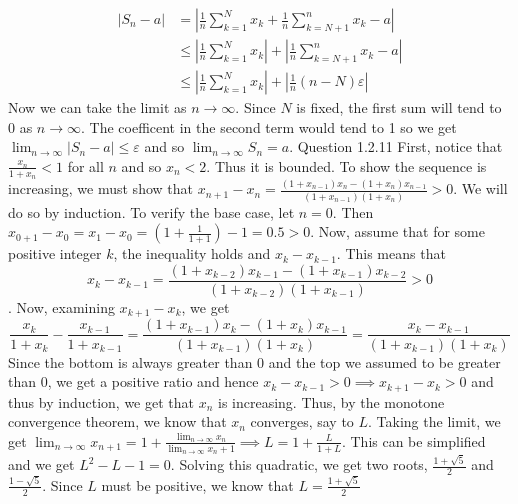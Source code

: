 \documentclass[12pt]{exam}
\begin{document}
\begin{questions}
\begin{align*}
    |S_n - a| &= \left| \frac{1}{n} \sum_{k=1}^{N} x_k + \frac{1}{n} \sum_{k=N+1}^{n} x_k - a \right| \\
              &\leq \left| \frac{1}{n} \sum_{k=1}^{N} x_k \right| + \left| \frac{1}{n} \sum_{k=N+1}^{n} x_k - a \right| \\
              &\leq \left| \frac{1}{n} \sum_{k=1}^{N} x_k \right| + \left| \frac{1}{n} (n - N) \varepsilon \right|
\end{align*}
Now we can take the limit as $n\rightarrow \infty$. Since $N$ is fixed, the first sum will tend to $0$ as $n\rightarrow\infty$. The coefficent in the second term would tend to 1 so we get $\lim_{n\rightarrow \infty} |S_n-a| \leq \varepsilon$ and so $\lim_{n\rightarrow \infty} S_n = a$.
\question Question 1.2.11 \newline
First, notice that $\frac{x_n}{1+x_n} < 1$ for all $n$ and so $x_n < 2$. Thus it is bounded. To show the sequence is increasing, we must show that $x_{n+1} - x_n = \frac{(1+x_{n-1})x_n-(1+x_n)x_{n-1}}{(1+x_{n-1})(1+x_n)} > 0$. We will do so by induction. To verify the base case, let $n=0$. Then $x_{0+1} - x_0 = x_1 - x_0 = (1+\frac{1}{1+1})-1 = 0.5 >0$. Now, assume that for some positive integer $k$, the inequality holds and $x_{k} - x_{k-1}$. This means that \[x_k-x_{k-1}= \frac{(1+x_{k-2})x_{k-1}-(1+x_{k-1})x_{k-2}}{(1+x_{k-2})(1+x_{k-1})} > 0\]. Now, examining $x_{k+1} - x_k$, we get \[\frac{x_k}{1+x_k} - \frac{x_{k-1}}{1+x_{k-1}} = \frac{(1+x_{k-1})x_k-(1+x_k)x_{k-1}}{(1+x_{k-1})(1+x_k)} = \frac{x_k - x_{k-1}}{(1+x_{k-1})(1+x_k)}\] Since the bottom is always greater than $0$ and the top we assumed to be greater than $0$, we get a positive ratio and hence $x_k - x_{k-1} > 0 \implies x_{k+1}-x_k>0$ and thus by induction, we get that $x_n$ is increasing. Thus, by the monotone convergence theorem, we know that $x_n$ converges, say to $L$. Taking the limit, we get $\lim_{n\rightarrow \infty} x_{n+1} = 1+\frac{\lim_{n\rightarrow \infty}x_n}{\lim_{n\rightarrow \infty}x_n + 1} \implies L = 1 + \frac{L}{1+L}$. This can be simplified and we get $L^2 - L - 1=0$. Solving this quadratic, we get two roots, $\frac{1+\sqrt{5}}{2}$ and $\frac{1-\sqrt{5}}{2}$. Since $L$ must be positive, we know that $L = \frac{1+\sqrt{5}}{2}$



\end{questions}
\end{document}
